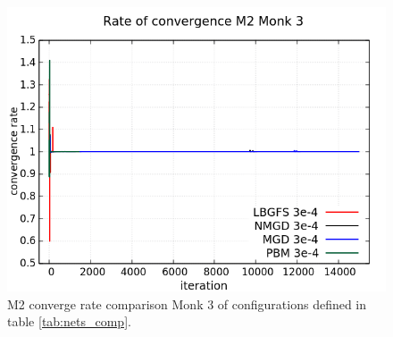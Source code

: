 \begin{figure}[H]
	\centering
	\includegraphics[width=0.6\linewidth]{data/Comparison/Monk3/Monk3_M2_CR_standard.png}
	\caption{M2 converge rate comparison Monk 3 of configurations defined in table \ref{tab:nets_comp}.}
	\label{fig:CR-M2-Monk3-Standard}
\end{figure}

